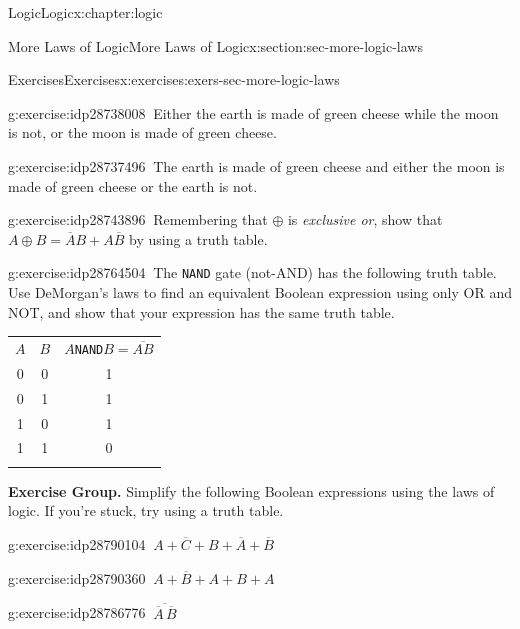\documentclass[twoside,10pt,]{book}
\newcommand{\tabularfont}{\relax}
\newcommand{\mono}[1]{\texttt{#1}}
\numberwithin{equation}{section}
\newcommand{\hrulethick} {\noalign{\hrule height 0.11em}}
\begin{document}
\begin{chapterptx}{Logic}{}{Logic}{}{}{x:chapter:logic}
\begin{sectionptx}{More Laws of Logic}{}{More Laws of Logic}{}{}{x:section:sec-more-logic-laws}
\begin{exercises-subsection}{Exercises}{}{Exercises}{}{}{x:exercises:exers-sec-more-logic-laws}
\begin{exercisegroup}
\begin{divisionexerciseeg}{23}{}{}{g:exercise:idp28738008}%
\(\ \)Either the earth is made of green cheese while the moon is not, or the moon is made of green cheese.\end{divisionexerciseeg}%
\begin{divisionexerciseeg}{24}{}{}{g:exercise:idp28737496}%
\(\ \)The earth is made of green cheese and either the moon is made of green cheese or the earth is not.\end{divisionexerciseeg}%
\begin{divisionexerciseeg}{25}{}{}{g:exercise:idp28743896}%
\(\ \)Remembering that \({\oplus}{}\) is \emph{exclusive or}, show that \(A{\oplus}{}B = \overline{A}{}B + A\overline{B}{}\) by using a truth table.\end{divisionexerciseeg}%
\begin{divisionexerciseeg}{26}{}{}{g:exercise:idp28764504}%
\(\ \)The \mono{NAND} gate (not-AND) has the following truth table.  Use DeMorgan's laws to find an equivalent Boolean expression using only OR and NOT, and show that your expression has the same truth table. \begin{center}%
{\tabularfont%
\begin{tabular}{ccc}\hrulethick
\(A\)&\(B\)&\(A\)\mono{NAND}\(B=\overline{AB}\)\tabularnewline[0pt]
0&0&1\tabularnewline[0pt]
0&1&1\tabularnewline[0pt]
1&0&1\tabularnewline[0pt]
1&1&0\tabularnewline\hrulethick
\end{tabular}
}%
\end{center}%
\end{divisionexerciseeg}%
\end{exercisegroup}
\par\medskip\noindent
\par\medskip\noindent%
\textbf{Exercise Group.}\space\space%
Simplify the following Boolean expressions using the laws of logic.  If you're stuck, try using a truth table.\begin{exercisegroup}
\begin{divisionexerciseeg}{27}{}{}{g:exercise:idp28790104}%
\(\ A + \overline{C}{} + B + \overline{A}{} + \overline{B}{}\)\end{divisionexerciseeg}%
\begin{divisionexerciseeg}{28}{}{}{g:exercise:idp28790360}%
\(\ A + \overline{B}{} + A + B + A\)\end{divisionexerciseeg}%
\begin{divisionexerciseeg}{29}{}{}{g:exercise:idp28786776}%
\(\ \overline{\overline{A}{}\,\overline{B}{}}\)\end{divisionexerciseeg}%

\end{exercisegroup}
\end{exercises-subsection}
\end{sectionptx}
\end{chapterptx}
\end{document}
